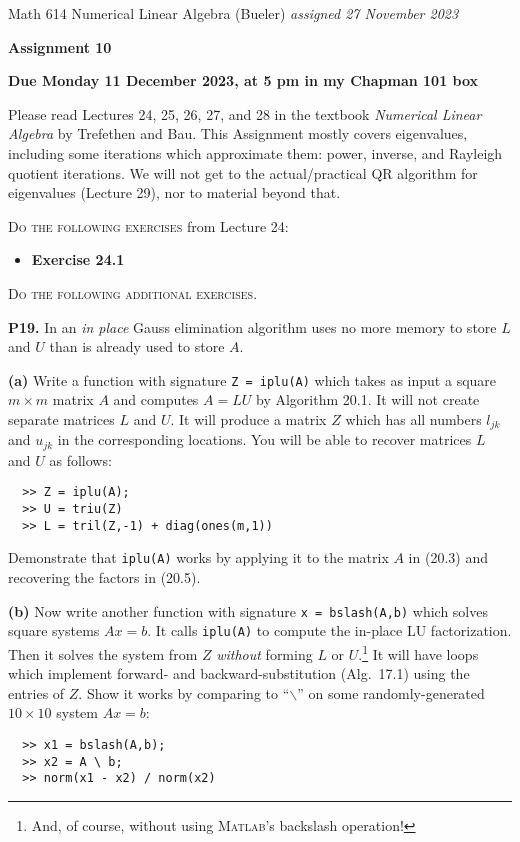 \documentclass[12pt]{amsart}
\newcommand{\prob}[1]{\bigskip\noindent\textbf{#1.}\quad }
\newcommand{\epart}[1]{\medskip\noindent\textbf{(#1)}\quad }
\newcommand{\Matlab}{\textsc{Matlab}\xspace}
\begin{document}
\scriptsize \noindent Math 614 Numerical Linear Algebra (Bueler) \hfill \emph{assigned 27 November 2023}
\normalsize\medskip

\Large\centerline{\textbf{Assignment 10}}
\large
\medskip

\centerline{\textbf{Due Monday 11 December 2023, at 5 pm in my Chapman 101 box}}
\medskip
\normalsize

\thispagestyle{empty}

\bigskip
\noindent Please read Lectures 24, 25, 26, 27, and 28 in the textbook \emph{Numerical Linear Algebra} by Trefethen and Bau.  This Assignment mostly covers eigenvalues, including some iterations which approximate them: power, inverse, and Rayleigh quotient iterations.  We will not get to the actual/practical QR algorithm for eigenvalues (Lecture 29), nor to material beyond that.

\bigskip
\noindent \textsc{Do the following exercises} from Lecture 24:

\begin{itemize}
\item \textbf{Exercise 24.1}
\end{itemize}


\bigskip
\noindent \textsc{Do the following additional exercises.}

\prob{P19}   In an \emph{in place} Gauss elimination algorithm uses no more memory to store $L$ and $U$ than is already used to store $A$.

\epart{a}  Write a function with signature \verb|Z = iplu(A)| which takes as input a square $m\times m$ matrix $A$ and computes $A=LU$ by Algorithm 20.1.  It will not create separate matrices $L$ and $U$.  It will produce a matrix $Z$ which has all numbers $l_{jk}$ and $u_{jk}$ in the corresponding locations.  You will be able to recover matrices $L$ and $U$ as follows:
\begin{verbatim}
  >> Z = iplu(A);
  >> U = triu(Z)
  >> L = tril(Z,-1) + diag(ones(m,1))
\end{verbatim}
Demonstrate that \verb|iplu(A)| works by applying it to the matrix $A$ in (20.3) and recovering the factors in (20.5).

\epart{b}  Now write another function with signature \verb|x = bslash(A,b)| which solves square systems $Ax=b$.  It calls \texttt{iplu(A)} to compute the in-place LU factorization.  Then it solves the system from $Z$ \emph{without} forming $L$ or $U$.\footnote{And, of course, without using \Matlab's backslash operation!}  It will have loops which implement forward- and backward-substitution (Alg.~17.1) using the entries of $Z$.  Show it works by comparing to ``$\backslash$'' on some randomly-generated $10\times 10$ system $Ax=b$:
\begin{verbatim}
  >> x1 = bslash(A,b);
  >> x2 = A \ b;
  >> norm(x1 - x2) / norm(x2)
\end{verbatim}
\end{document}
